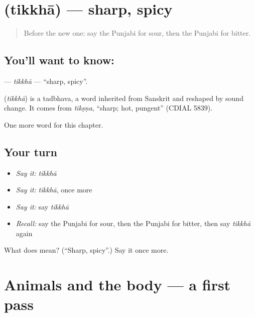 \section[\texorpdfstring{\pa{ਤਿੱਖਾ} (tikkhā)}{ਤਿੱਖਾ (tikkhā)}]{ (tikkhā) — sharp, spicy}

\label{lesson:PA-C143-tikkha}



\begin{quote}
Before the new one: say the Punjabi for sour, then the Punjabi for bitter.
\end{quote}

\subsection*{You'll want to know: }
\textbf{} — \emph{tikkhā} — \textquotedblleft{}sharp, spicy\textquotedblright{}.

\begin{cousinweb}
\textbf{} (\emph{tikkhā}) is a tadbhava, a word inherited from Sanskrit and reshaped by sound change. It comes from \emph{tīkṣṇa}, \textquotedblleft{}sharp; hot, pungent\textquotedblright{} (CDIAL 5839).
\end{cousinweb}

\begin{grammarlens}[title={What you've built}]
One more word for this chapter.
\end{grammarlens}

\subsection*{Your turn}
\begin{itemize}
\raggedright
  \item \emph{Say it:} \emph{tikkhā}
  \item \emph{Say it:} \emph{tikkhā}, once more
  \item \emph{Say it:} say \emph{tikkhā}
  \item \emph{Recall:} say the Punjabi for sour, then the Punjabi for bitter, then say \emph{tikkhā} again
\end{itemize}

\begin{tcolorbox}[breakable,colback=teal!4,colframe=teal!35!black,title={Before you move on}]
What does  mean? (\textquotedblleft{}Sharp, spicy\textquotedblright{}.) Say it once more.
\end{tcolorbox}
\section[(dialogue)]{Animals and the body — a first pass}

